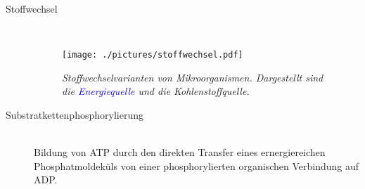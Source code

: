 \begin{description}
	 \item[Stoffwechsel] \hfill \\

		\begin{figure}[ht!]
		\leavevmode
		\begin{center}
		\texttt{[image: ./pictures/stoffwechsel.pdf]}
		\end{center}
		\caption{\slshape{Stoffwechselvarianten von Mikroorganismen.
								Dargestellt sind die \textcolor{blue}{Energiequelle} und die Kohlenstoffquelle.}}
		\label{fig:Stoffwechselvarianten}
		\end{figure}

	\item[Substratkettenphosphorylierung]	\hfill	\\
		Bildung von ATP durch den direkten Transfer eines ernergiereichen
		Phosphatmoldeküls von einer phosphorylierten organischen Verbindung
		auf ADP.
\end{description}
